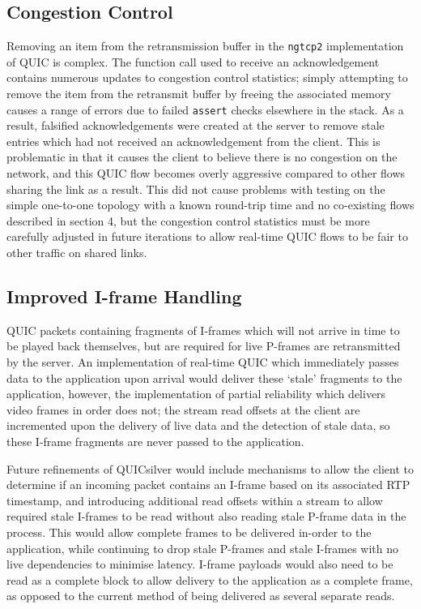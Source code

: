 \documentclass{mpaper}
\begin{document}
\subsection{Congestion Control}
Removing an item from the retransmission buffer in the \texttt{ngtcp2} implementation of QUIC is complex. The function call used to receive an acknowledgement contains numerous updates to congestion control statistics; simply attempting to remove the item from the retransmit buffer by freeing the associated memory causes a range of errors due to failed \texttt{assert} checks elsewhere in the stack. As a result, falsified acknowledgements were created at the server to remove stale entries which had not received an acknowledgement from the client. This is problematic in that it causes the client to believe there is no congestion on the network, and this QUIC flow becomes overly aggressive compared to other flows sharing the link as a result. This did not cause problems with testing on the simple one-to-one topology with a known round-trip time and no co-existing flows described in section 4, but the congestion control statistics must be more carefully adjusted in future iterations to allow real-time QUIC flows to be fair to other traffic on shared links.


\subsection{Improved I-frame Handling}
QUIC packets containing fragments of I-frames which will not arrive in time to be played back themselves, but are required for live P-frames are retransmitted by the server. An implementation of real-time QUIC which immediately passes data to the application upon arrival would deliver these `stale' fragments to the application, however, the implementation of partial reliability which delivers video frames in order does not; the stream read offsets at the client are incremented upon the delivery of live data and the detection of stale data, so these I-frame fragments are never passed to the application.


Future refinements of QUICsilver would include mechanisms to allow the client to determine if an incoming packet contains an I-frame based on its associated RTP timestamp, and introducing additional read offsets within a stream to allow required stale I-frames to be read without also reading stale P-frame data in the process. This would allow complete frames to be delivered in-order to the application, while continuing to drop stale P-frames and stale I-frames with no live dependencies to minimise latency. I-frame payloads would also need to be read as a complete block to allow delivery to the application as a complete frame, as opposed to the current method of being delivered as several separate reads.
\end{document}
